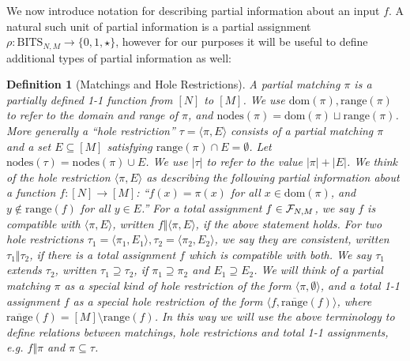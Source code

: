 \documentclass[11pt]{article}
\newtheorem{definition}{Definition}
\newcommand{\dom}{\mathrm{dom}}
\newcommand{\rng}{\mathrm{range}}
\newcommand{\corng}{\overline{\mathrm{range}}}
\newcommand{\nodes}{\mathrm{nodes}}
\begin{document}
We now introduce notation for describing partial information about an input $f$. A natural such unit of partial information is a partial assignment $\rho : \mathrm{BITS}_{N,M} \to \{0,1,\star\}$, however for our purposes it will be useful to define additional types of partial information as well:

\begin{definition}[Matchings and Hole Restrictions]
A partial matching $\pi$ is a partially defined 1-1 function from $[N]$ to $[M]$. We use $\dom(\pi), \rng(\pi)$ to refer to the domain and range of $\pi$, and $\nodes(\pi)= \dom(\pi) \sqcup \rng(\pi)$. More generally a ``hole restriction'' $\tau = \langle \pi, E\rangle$ consists of a partial matching $\pi$ and a set $E \subseteq [M]$ satisfying $\rng(\pi) \cap E = \emptyset$.  Let $\nodes(\tau) = \nodes(\pi) \cup E$. We use $|\tau|$ to refer to the value $|\pi| + |E|$. We think of the hole restriction $\langle \pi, E\rangle$ as describing the following partial information about a function $f: [N] \to [M]$: ``$f(x) = \pi(x)$ for all $x \in \dom(\pi)$, and $y \notin \rng(f)$ for all $y \in E$.''  For a total assignment $f \in {\cal F}_{N,M}$, we say $f$ is compatible with $\langle \pi, E\rangle$, written $f \Vert \langle \pi, E\rangle$, if the above statement holds. For two hole restrictions $\tau_1=\langle \pi_1,E_1\rangle, \tau_2=\langle \pi_2,E_2\rangle$, we say they are consistent, written $\tau_1 \Vert \tau_2$, if there is a total assignment $f$ which is compatible with both. We say $\tau_1$ extends $\tau_2$, written $\tau_1\supseteq \tau_2$, if $\pi_1 \supseteq \pi_2$ and $E_1 \supseteq E_2$. We will think of a partial matching $\pi$ as a special kind of hole restriction of the form $\langle \pi, \emptyset\rangle$, and a total 1-1 assignment $f$ as a special hole restriction of the form $\langle f, \corng(f)\rangle$, where $\corng(f)= [M] \setminus \rng(f)$. In this way we will use the above terminology to define relations between matchings, hole restrictions and total 1-1 assignments, e.g. $f \Vert \pi$ and $\pi \subseteq \tau$. 

\end{definition}
\end{document}
